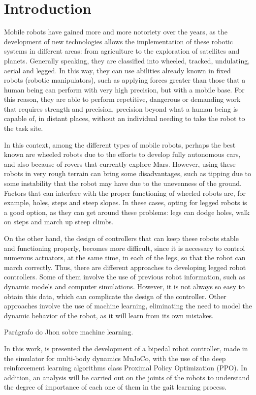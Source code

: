 
\section{Introduction}

Mobile robots have gained more and more notoriety over the years, as the development of new technologies allows the implementation of these robotic systems in different areas: from agriculture to the exploration of satellites and planets. Generally speaking, they are classified into wheeled, tracked, undulating, aerial and legged. In this way, they can use abilities already known in fixed robots (robotic manipulators), such as applying forces greater than those that a human being can perform with very high precision, but with a mobile base. For this reason, they are able to perform repetitive, dangerous or demanding work that requires strength and precision, precision beyond what a human being is capable of, in distant places, without an individual needing to take the robot to the task site.

In this context, among the different types of mobile robots, perhaps the best known are wheeled robots due to the efforts to develop fully autonomous cars, and also because of rovers that currently explore Mars. However, using these robots in very rough terrain can bring some disadvantages, such as tipping due to some instability that the robot may have due to the unevenness of the ground. Factors that can interfere with the proper functioning of wheeled robots are, for example, holes, steps and steep slopes. In these cases, opting for legged robots is a good option, as they can get around these problems: legs can dodge holes, walk on steps and march up steep climbs.

On the other hand, the design of controllers that can keep these robots stable and functioning properly, becomes more difficult, since it is necessary to control numerous actuators, at the same time, in each of the legs, so that the robot can march correctly. Thus, there are different approaches to developing legged robot controllers. Some of them involve the use of previous robot information, such as dynamic models and computer simulations. However, it is not always so easy to obtain this data, which can complicate the design of the controller. Other approaches involve the use of machine learning, eliminating the need to model the dynamic behavior of the robot, as it will learn from its own mistakes.

Parágrafo do Jhon sobre machine learning.

In this work, is presented the development of a bipedal robot controller, made in the simulator for multi-body dynamics MuJoCo, with the use of the deep reinforcement learning algorithms class Proximal Policy Optimization (PPO). In addition, an analysis will be carried out on the joints of the robots to understand the degree of importance of each one of them in the gait learning process.
